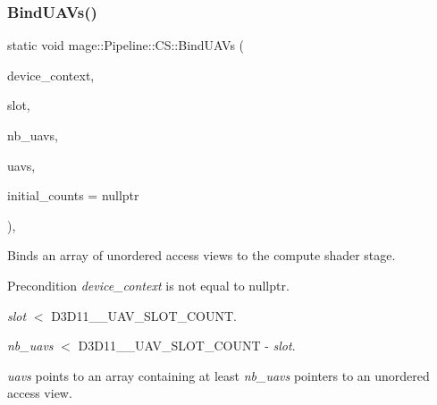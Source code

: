\subsubsection{\texorpdfstring{Bind\+U\+A\+Vs()}{BindUAVs()}}
{\footnotesize\ttfamily static void mage\+::\+Pipeline\+::\+C\+S\+::\+Bind\+U\+A\+Vs (\begin{DoxyParamCaption}\item[{I\+D3\+D11\+Device\+Context4 $\ast$}]{device\+\_\+context,  }\item[{\hyperlink{namespacemage_a41c104c036fba3756a74e19f793eeaa1}{U32}}]{slot,  }\item[{\hyperlink{namespacemage_a41c104c036fba3756a74e19f793eeaa1}{U32}}]{nb\+\_\+uavs,  }\item[{I\+D3\+D11\+Unordered\+Access\+View $\ast$const $\ast$}]{uavs,  }\item[{const \hyperlink{namespacemage_a41c104c036fba3756a74e19f793eeaa1}{U32} $\ast$}]{initial\+\_\+counts = {\ttfamily nullptr} }\end{DoxyParamCaption})\hspace{0.3cm}{\ttfamily [static]}, {\ttfamily [noexcept]}}

Binds an array of unordered access views to the compute shader stage.

\begin{DoxyPrecond}{Precondition}
{\itshape device\+\_\+context} is not equal to {\ttfamily nullptr}. 

{\itshape slot} $<$ {\ttfamily D3\+D11\+\_\+\_\+\+U\+A\+V\+\_\+\+S\+L\+O\+T\+\_\+\+C\+O\+U\+NT}. 

{\itshape nb\+\_\+uavs} $<$ {\ttfamily D3\+D11\+\_\+\_\+\+U\+A\+V\+\_\+\+S\+L\+O\+T\+\_\+\+C\+O\+U\+NT} -\/ {\itshape slot}. 

{\itshape uavs} points to an array containing at least {\itshape nb\+\_\+uavs} pointers to an unordered access view. 
\end{DoxyPrecond}

